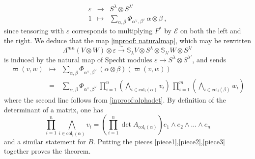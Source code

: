 \documentclass[10pt]{amsart}
\theoremstyle{definition}
\theoremstyle{remark}
\numberwithin{equation}{section}
\newcommand{\To}{\longrightarrow}
\newcommand{\bwedge}{\mathsf{\Lambda}}
\newcommand{\0}{\color{blue}{\mathsf{0}}}
\begin{document}
 \begin{eqnarray}  \label{varepsilonSection} 
 \varepsilon &  \To   &  S^{\lambda}\otimes S^{\lambda'}  \\
 1 & \mapsto & \sum_{\alpha, \beta} \Phi_{\alpha^{\vee}, \beta^{\vee}}\,  \alpha\otimes \beta  \ ,   \nonumber 
 \end{eqnarray}  
since tensoring with $\varepsilon$ corresponds to multiplying $F^*$ by $\mathcal{E}$ on both the left and the right.   We deduce that the map \eqref{inproof: naturalmap}, which may be rewritten
\[     \bwedge^{mn} \left( V \otimes W \right)  \otimes \varepsilon  \overset{\sim}{\To}    \mathbb{S}_{\lambda} V \otimes S^{\lambda}  \otimes  \mathbb{S}_{\lambda'} W  \otimes S^{\lambda'} \]
 is induced by the natural map
 of Specht modules $ \varepsilon\rightarrow   S^{\lambda}\otimes S^{\lambda'}$, 
 and sends 
 \begin{eqnarray}   \label{piece2} \varpi(v,w) & \mapsto  &  \sum_{\alpha, \beta}  \Phi_{\alpha^{\vee}, \beta^{\vee}} \, (\alpha \otimes \beta )(\varpi(v,w))  \\
  & = &  \sum_{\alpha, \beta}  \Phi_{\alpha^{\vee}, \beta^{\vee}}\,   \prod_{i=1}^n \left( \bigwedge_{i\in \mathrm{col}_i(\alpha)} v_i \right) \,  \prod_{i=1}^m  \left( \bigwedge_{i\in \mathrm{col}_i(\beta)} w_i \right) \nonumber 
 \end{eqnarray} 
  where the second line follows from  \eqref{inproof:alphadet}.
 By definition of the determinant of a matrix, one has 
 \begin{equation} \label{piece3} \prod_{i=1}^n   \bigwedge_{i\in \mathrm{col}_i(\alpha)} v_i  = \left( \prod_{i=1}^n  \det A_{\mathrm{col}_i(\alpha)}  \right)   e_1\wedge e_2 \wedge \ldots \wedge e_n
 \end{equation}
 and a similar statement for $B$. Putting the pieces \eqref{piece1},\eqref{piece2},\eqref{piece3} together  proves the theorem. 
 
\end{document}
